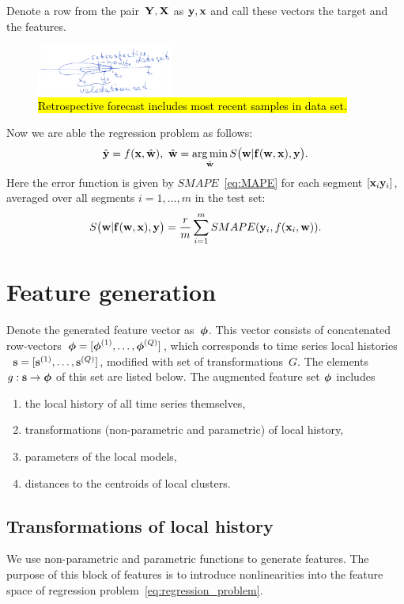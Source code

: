 \documentclass[conference]{IEEEtran}
\begin{document}
Denote a row from the pair~$\mathbf{Y},{\mathbf{X}}$ as ${\mathbf{y}},{\mathbf{x}}$ and call these vectors the target and the features.

\begin{figure}[!ht]
\centering\includegraphics[width=0.4\textwidth]{retrospective_validation.png}
\caption{\hl{Retrospective forecast includes most recent samples in data set.}\label{fg:retrospective}}
\end{figure}

Now we are able the regression problem as follows:
\begin{equation}\label{eq:regression_problem}
\hat{\y} = f(\x, \hat{\w}), ~\hat{\w} = \argmin_{\hat{\w}}S\bigl(\bw|\fx(\bw,\bx),\by\bigr). %
\end{equation}
Here the error function is given by $SMAPE$~\eqref{eq:MAPE} for each segment $[{\mathbf{x}}_i {\mathbf{y}}_i]$, averaged over all segments $i = 1, \dots, m$ in the test set:
\[ S\bigl(\mathbf{w}|{\mathbf{f}}(\mathbf{w},{\mathbf{x}}),{\mathbf{y}}\bigr) = \frac{r}{m}\sum_{i=1}^{m} SMAPE({\mathbf{y}}_i, f({\mathbf{x}}_i, {\mathbf{w}})).\]

\section{Feature generation}\label{sc:feature_generation}
Denote the generated feature vector as~${\boldsymbol{\phi}}$. This vector consists of concatenated row-vectors~${\boldsymbol{\phi}}=[{\boldsymbol{\phi}}^{(1)},\dots,{\boldsymbol{\phi}}^{(Q)}]$, which corresponds to time series local histories ~${\mathbf{s}}=[{\mathbf{s}}^{(1)},\dots,{\mathbf{s}}^{(Q)}]$, modified with set of transformations~$G$. The elements~$g:{\mathbf{s}}\to{\boldsymbol{\phi}}$ of this set are listed below. The augmented feature set ${\boldsymbol{\phi}}$ includes
\begin{enumerate}[1)]
\item the local history of all time series themselves,
\item transformations (non-parametric and parametric) of local history,
\item parameters of the local models,
\item distances to the centroids of local clusters.
\end{enumerate}



\subsection{Transformations of local history}
We use non-parametric and parametric functions to generate features. The purpose of this block of features is to introduce nonlinearities into the feature space of regression problem~\eqref{eq:regression_problem}.
\end{document}
